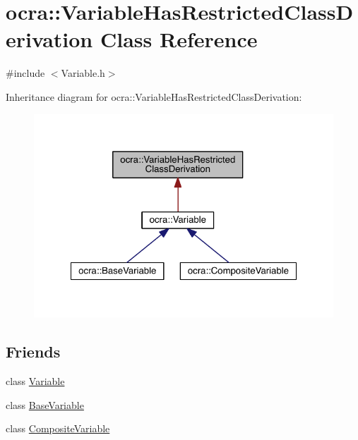 \hypertarget{classocra_1_1VariableHasRestrictedClassDerivation}{}\section{ocra\+:\+:Variable\+Has\+Restricted\+Class\+Derivation Class Reference}
\label{classocra_1_1VariableHasRestrictedClassDerivation}


{\ttfamily \#include $<$Variable.\+h$>$}



Inheritance diagram for ocra\+:\+:Variable\+Has\+Restricted\+Class\+Derivation\+:\nopagebreak
\begin{figure}[H]
\begin{center}
\leavevmode
\includegraphics[width=322pt]{d7/db2/classocra_1_1VariableHasRestrictedClassDerivation__inherit__graph}
\end{center}
\end{figure}
\subsection*{Friends}
\begin{DoxyCompactItemize}
\item 
class \hyperlink{classocra_1_1VariableHasRestrictedClassDerivation_a9b0a9a1a9dc58fc36b535bb33c612b49}{Variable}
\item 
class \hyperlink{classocra_1_1VariableHasRestrictedClassDerivation_a5136a88d8c0a1d58621286f1c82a7b45}{Base\+Variable}
\item 
class \hyperlink{classocra_1_1VariableHasRestrictedClassDerivation_a5ab4ec1f2934216b6101035293996613}{Composite\+Variable}
\end{DoxyCompactItemize}


